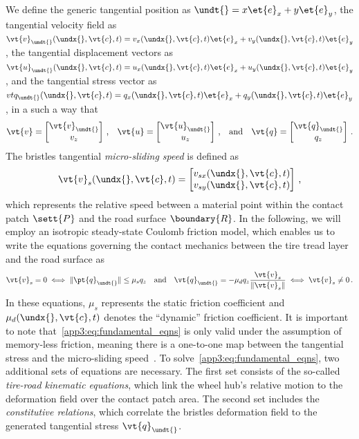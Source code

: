 We define the generic tangential position as $\undt{} = x\et{e}_x + y\et{e}_y$, the tangential velocity field as $\vt{v}_{\undt{}}(\undx{}, \vt{c}, t) = v_x(\undx{}, \vt{c}, t)\et{e}_x + v_y(\undx{},\vt{c},t)\et{e}_y$, the tangential displacement vectors as $\vt{u}_{\undt{}}(\undx{},\vt{c},t) = u_x(\undx{},\vt{c},t)\et{e}_x + u_y(\undx{},\vt{c},t)\et{e}_y$, and the tangential stress vector as $vt{q}_{\undt{}}(\undx{},\vt{c},t) = q_x(\undx{},\vt{c},t)\et{e}_x + q_y(\undx{},\vt{c},t)\et{e}_y$, in a such a way that
%
\begin{equation}
  \vt{v} =
  \begin{bmatrix}
    \vt{v}_{\undt{}} \\
    v_z
  \end{bmatrix} \, \text{,} \quad
  \vt{u} =
  \begin{bmatrix}
    \vt{u}_{\undt{}} \\
    u_z
  \end{bmatrix} \, \text{,} \quad \text{and} \quad
  \vt{q} =
  \begin{bmatrix}
    \vt{q}_{\undt{}} \\
    q_z
  \end{bmatrix} \, \text{.}
  \label{app3:eq:ut}
\end{equation}
%
The bristles tangential \emph{micro-sliding speed} is defined as
%
\begin{equation*}
  \vt{v}_s(\undx{},\vt{c},t) =
  \begin{bmatrix}
    v_{sx}(\undx{},\vt{c},t) \\
    v_{sy}(\undx{},\vt{c},t)
  \end{bmatrix} \, \text{,}
\end{equation*}
%
which represents the relative speed between a material point within the contact patch $\sett{P}$ and the road surface $\boundary{R}$. In the following, we will employ an isotropic steady-state Coulomb friction model, which enables us to write the equations governing the contact mechanics between the tire tread layer and the road surface as
%
\begin{equation}
  \vt{v}_s = 0 \iff \|\pt{q}_{\undt{}}\| \leq \mu_s q_z
  \quad \text{and} \quad
  \vt{q}_{\undt{}} = -\mu_d q_z \dfrac{\vt{v}_s}{\|\vt{v}_s\|}
  \iff \vt{v}_s \neq 0 \, \text{.}
  \label{app3:eq:fundamental_eqns}
\end{equation}
%
In these equations, $\mu_s$ represents the static friction coefficient and $\mu_d(\undx{}, \vt{c}, t)$ denotes the ``dynamic'' friction coefficient. It is important to note that~\eqref{app3:eq:fundamental_eqns} is only valid under the assumption of memory-less friction, meaning there is a one-to-one map between the tangential stress and the micro-sliding speed~\cite{canudasdewit2003dynamic}. To solve~\eqref{app3:eq:fundamental_eqns}, two additional sets of equations are necessary. The first set consists of the so-called \emph{tire-road kinematic equations}, which link the wheel hub's relative motion to the deformation field over the contact patch area. The second set includes the \emph{constitutive relations}, which correlate the bristles deformation field to the generated tangential stress $\vt{q}_{\undt{}}$.


